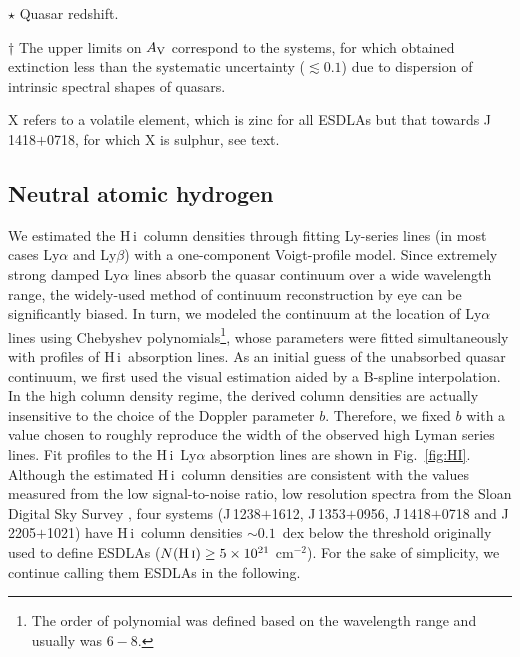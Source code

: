 \documentclass[fleqn,usenatbib,useAMS]{mnras}
\newcommand{\HI}{H\,{\sc i}}
\begin{document}
\begin{table*}
\begin{tabular}{cllcccllcrcc}
\hline
\end{tabular}
\begin{tablenotes}
        \item $\star$ Quasar redshift.
        \item $\dagger$ The upper limits on $A_{\rm V}$ correspond to the systems, for which obtained extinction less than the systematic uncertainty ($\lesssim0.1$) due to dispersion of intrinsic spectral shapes of quasars. 
        \item X refers to a volatile element, which is zinc for all ESDLAs but that towards J\,1418$+$0718, for which X is sulphur, see text.
\end{tablenotes}
\end{table*}

\subsection{Neutral atomic hydrogen}\label{subsec:HI_fitting}

We estimated the \HI\ column densities through fitting Ly-series lines (in most cases Ly$\alpha$ and Ly$\beta$) with a one-component Voigt-profile model. 
Since extremely strong damped Ly$\alpha$ lines absorb the quasar continuum over a wide wavelength range, the widely-used method of continuum reconstruction by eye can be significantly biased. In turn, we modeled the continuum at the location of Ly$\alpha$ lines using Chebyshev polynomials\footnote{The order of polynomial was defined based on the wavelength range and usually was $6-8$.}, whose parameters were fitted simultaneously with profiles of \HI\ absorption lines. As an initial guess of the unabsorbed quasar continuum, we first used the visual estimation aided by a B-spline interpolation. In the high column density regime, the derived column densities are actually insensitive to the choice of the Doppler parameter $b$. Therefore, we fixed $b$ with a value chosen to roughly reproduce the width of the observed high Lyman series lines. Fit profiles to the \HI\ Ly$\alpha$ absorption lines are shown in Fig.~\ref{fig:HI}.
Although the estimated \HI\ column densities are consistent with the values measured from the low signal-to-noise ratio, low resolution spectra from the Sloan Digital Sky Survey \citep{Noterdaeme2012a,Noterdaeme2014}, four systems (J\,1238$+$1612, J\,1353$+$0956, J\,1418$+$0718 and J\,2205$+$1021) have \HI\ column densities $\sim0.1$~dex below the threshold originally used to define ESDLAs ($N(\text{\HI})\ge 5\times10^{21}$ cm$^{-2}$). 
For the sake of simplicity, we continue calling them ESDLAs in the following.
\end{document}
